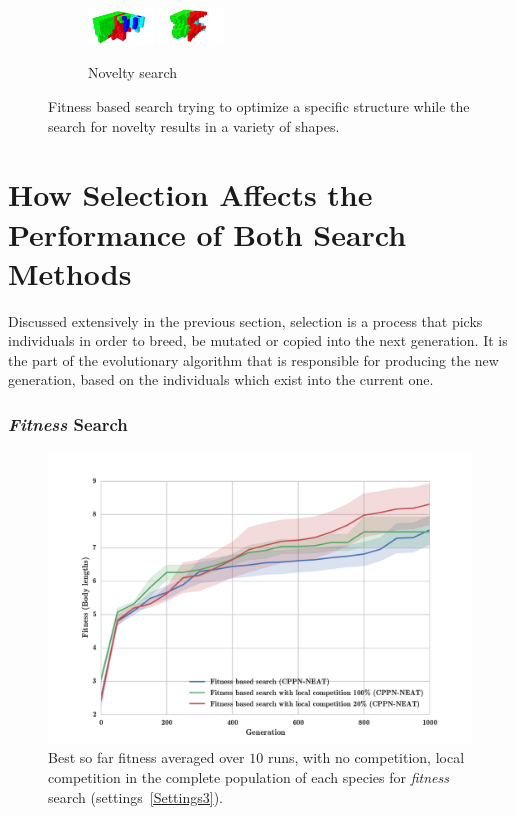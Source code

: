 \begin{figure}
\begin{subfigure}[b]{1.0\textwidth}
\includegraphics[width=0.19\textwidth]{../Figures/Robots/n_4_g_900.jpg}
\includegraphics[width=0.19\textwidth]{../Figures/Robots/n_4_g_1000.jpg}
\caption{Novelty search}
\end{subfigure}
\label{fig:morphologyDiversity}
\caption{Fitness based search trying to optimize a specific structure while the search for novelty results in a variety of shapes.}
\end{figure}


\section{How Selection Affects the Performance of Both Search Methods}

Discussed extensively in the previous section, selection is a process that picks individuals in order to breed, be mutated or copied into the next generation. It is the part of the evolutionary algorithm that is responsible for producing the new generation, based on the individuals which exist into the current one.


\subsubsection*{\emph{Fitness} Search}

\begin{figure}[t!]
\centering
\includegraphics[width=1.0\textwidth]{../Figures/Results/fitComp100_20percent.pdf}
\caption{Best so far fitness averaged over $10$ runs, with no competition, local competition in the complete population of each species for \emph{fitness} search (settings~\ref{Settings3}).}
\label{fig:fitComp100_20percent}
\end{figure}


